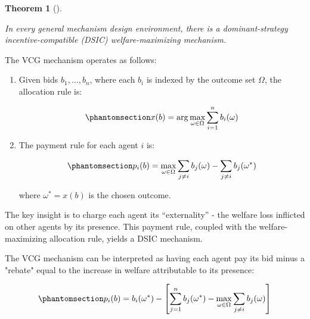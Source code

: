 \documentclass[
  letterpaper,
  numbers=noenddot,
  DIV=11]{scrreprt}
\theoremstyle{plain}
\newtheorem{theorem}{Theorem}[chapter]
\theoremstyle{definition}
\theoremstyle{plain}
\theoremstyle{remark}
\begin{document}
\begin{tcolorbox}[colframe=.grey, title=\faPenSquare \enspace Theorem]

\begin{theorem}[]\protect\hypertarget{thm-VCG}{}\label{thm-VCG}

\label{thm:VCG}{} In every general mechanism design
environment, there is a dominant-strategy incentive-compatible (DSIC)
welfare-maximizing mechanism.

\end{theorem}

\end{tcolorbox}

The VCG mechanism operates as follows:

\begin{enumerate}
\def\labelenumi{\arabic{enumi}.}
\item
  Given bids \(b_1, \ldots, b_n\), where each \(b_i\) is indexed by the
  outcome set \(\Omega\), the allocation rule is:

  \begin{equation}\phantomsection\label{eq-eq3.65}{x(b) = \arg \max_{\omega \in \Omega} \sum_{i=1}^n b_i(\omega)}\end{equation}
\item
  The payment rule for each agent \(i\) is:

  \begin{equation}\phantomsection\label{eq-eq3.66}{p_i(b) = \max_{\omega \in \Omega} \sum_{j \neq i} b_j(\omega) - \sum_{j \neq i} b_j(\omega^*)}\end{equation}

  where \(\omega^* = x(b)\) is the chosen outcome.
\end{enumerate}

The key insight is to charge each agent its ``externality'' - the
welfare loss inflicted on other agents by its presence. This payment
rule, coupled with the welfare-maximizing allocation rule, yields a DSIC
mechanism.

The VCG mechanism can be interpreted as having each agent pay its bid
minus a "rebate" equal to the increase in welfare attributable to its
presence:

\begin{equation}\phantomsection\label{eq-eq3.67}{p_i(b) = b_i(\omega^*) - \left[ \sum_{j=1}^n b_j(\omega^*) - \max_{\omega \in \Omega} \sum_{j \neq i} b_j(\omega) \right]}\end{equation}
\end{document}
